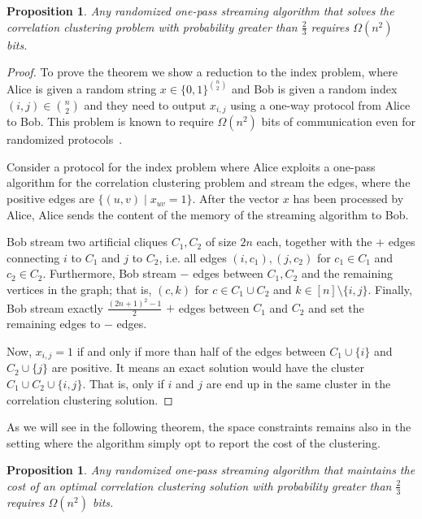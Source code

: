 \documentclass{article}
\newtheorem{proposition}[theorem]{Proposition}
\newcommand{\clique}[1]{C_{#1}}
\begin{document}
\begin{proposition}\label{proposition:lbzeroclustering}
    Any randomized one-pass streaming algorithm that solves the correlation clustering problem with probability greater than $\frac{2}{3}$ requires $\Omega(n^2)$ bits.
\end{proposition}

\begin{proof}

    To prove the theorem we show a reduction to the index problem, where Alice is given a random string $x\in \{0,1\} ^{{\binom{n}{2}}}$ and Bob is given a random index $(i,j) \in {\binom{n}{2}}$ and they need to output $x_{i,j}$ using a one-way protocol from Alice to Bob. This problem is known to require $\Omega(n^2)$ bits of communication even for randomized protocols~\cite{ablayev1996lower}.

    Consider a protocol for the index problem where Alice exploits a one-pass algorithm for the correlation clustering problem and stream the edges, where the positive edges are $\{ (u,v) \mid x_{uv}=1 \}$. After the vector $x$ has been processed by Alice, Alice sends the content of the memory of the streaming algorithm to Bob.

    Bob stream two artificial cliques $\clique{1}, \clique{2}$ of size $2n$ each, together with the $+$ edges connecting $i$ to $\clique{1}$ and $j$ to $\clique{2}$, i.e. all edges $(i,c_1), (j,c_2)$ for $c_1 \in \clique{1}$ and $c_2 \in \clique{2}$.
    Furthermore, Bob stream $-$ edges between $C_1,C_2$ and the remaining vertices in the graph; that is, $(c,k)$ for $c \in \clique{1} \cup \clique{2}$ and $k \in [n] \setminus \{i,j\}$. 
    Finally, Bob stream exactly $\frac{(2n+1)^2-1}{2}$ $+$ edges between $\clique{1}$ and $\clique{2}$ and set the remaining edges to $-$ edges.

    Now, $x_{i,j}=1$ if and only if more than half of the edges between $\clique{1} \cup \{ i \}$ and $\clique{2} \cup \{ j \}$ are positive. It means an exact solution would have the cluster $\clique{1} \cup \clique{2} \cup \{ i,j \}$. That is, only if $i$ and $j$ are end up in the same cluster in the correlation clustering solution.
\end{proof}

As we will see in the following theorem, the space constraints remains also in the setting where the algorithm simply opt to report the cost of the clustering.

\begin{proposition}\label{proposition:lbzeroscore}
    Any randomized one-pass streaming algorithm that maintains the cost of an optimal correlation clustering solution with probability greater than $\frac{2}{3}$ requires $\Omega(n^2)$ bits.
\end{proposition}
\end{document}
